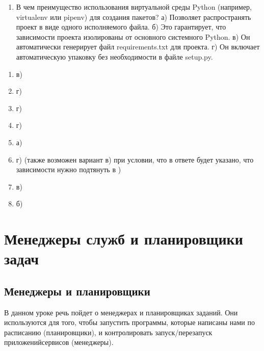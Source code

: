 \documentclass[letterpaper,10pt,russian]{sphinxmanual}
\begin{document}
\begin{enumerate}
\item {} 
\sphinxAtStartPar
В чем преимущество использования виртуальной среды Python (например, virtualenv или pipenv) для создания пакетов?
а) Позволяет распространять проект в виде одного исполняемого файла.
б) Это гарантирует, что зависимости проекта изолированы от основного системного Python.
в) Он автоматически генерирует файл requirements.txt для проекта.
г) Он включает автоматическую упаковку без необходимости в файле setup.py.

\end{enumerate}

\sphinxAtStartPar
{}
\begin{enumerate}
%
\item {} 
\sphinxAtStartPar
в)

\item {} 
\sphinxAtStartPar
г)

\item {} 
\sphinxAtStartPar
г)

\item {} 
\sphinxAtStartPar
г)

\item {} 
\sphinxAtStartPar
а)

\item {} 
\sphinxAtStartPar
г) (также возможен вариант в) при условии, что в ответе будет указано, что зависимости нужно подтянуть в )

\item {} 
\sphinxAtStartPar
в)

\item {} 
\sphinxAtStartPar
б)

\end{enumerate}


\chapter{Менеджеры служб и планировщики задач}
\label{\detokenize{index:id15}}
\sphinxstepscope


\section{Менеджеры и планировщики}
\label{\detokenize{educational_materials/managers/content:id1}}\label{\detokenize{educational_materials/managers/content::doc}}
\sphinxAtStartPar
В данном уроке речь пойдет о менеджерах и планировщиках заданий. Они используются для того, чтобы запустить программы, которые написаны нами по расписанию (планировщики), и контролировать запуск/перезапуск приложений\sphinxhyphen{}сервисов (менеджеры).
\end{document}

